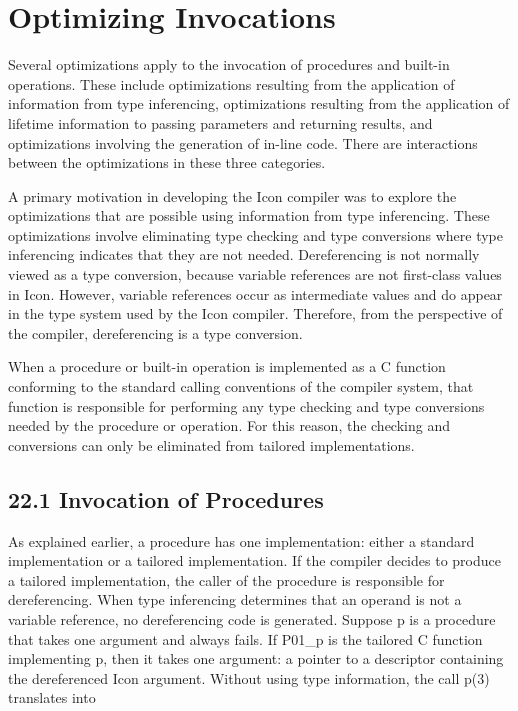 \chapter{Optimizing Invocations}

Several optimizations apply to the invocation of procedures and
built-in operations. These include optimizations resulting from the
application of information from type inferencing, optimizations
resulting from the application of lifetime information to passing
parameters and returning results, and optimizations involving the
generation of in-line code. There are interactions between the
optimizations in these three categories.

A primary motivation in developing the Icon compiler was to explore
the optimizations that are possible using information from type
inferencing. These optimizations involve eliminating type checking and
type conversions where type inferencing indicates that they are not
needed. Dereferencing is not normally viewed as a type conversion,
because variable references are not first-class values in
Icon. However, variable references occur as intermediate values and do
appear in the type system used by the Icon compiler. Therefore, from
the perspective of the compiler, dereferencing is a type conversion.

When a procedure or built-in operation is implemented as a C function
conforming to the standard calling conventions of the compiler system,
that function is responsible for performing any type checking and type
conversions needed by the procedure or operation. For this reason, the
checking and conversions can only be eliminated from tailored
implementations.


\section[22.1 Invocation of Procedures]{22.1 Invocation of Procedures}

As explained earlier, a procedure has one implementation: either a
standard implementation or a tailored implementation.  If the compiler
decides to produce a tailored implementation, the caller of the
procedure is responsible for dereferencing. When type inferencing
determines that an operand is not a variable reference, no
dereferencing code is generated. Suppose p is a procedure that takes
one argument and always fails. If P01\_p is the tailored C function
implementing p, then it takes one argument: a pointer to a descriptor
containing the dereferenced Icon argument.  Without using type
information, the call p(3) translates into

